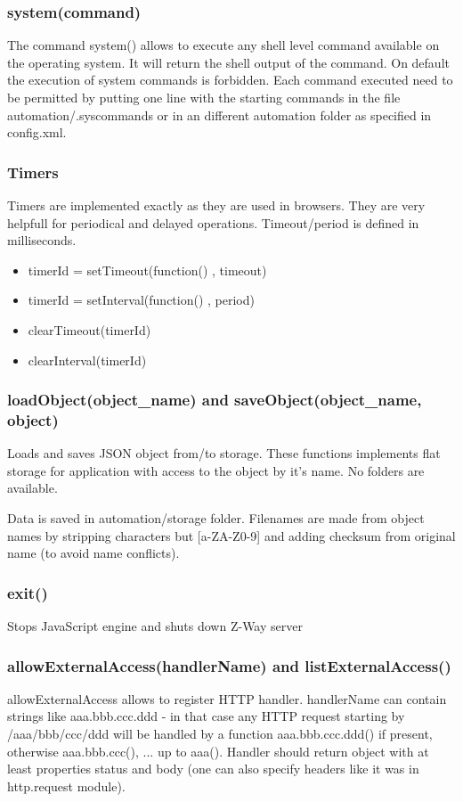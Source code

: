 \subsubsection{system(command)}

The command system() allows to execute any shell level command available on the operating 
system. It will return the shell output of the command.  On default the execution of 
system commands is forbidden. Each command executed need to be permitted by putting one 
line with the starting commands in the file automation/.syscommands or in an different 
automation folder as specified in config.xml.

\subsubsection{Timers}
Timers are implemented exactly as they are used in browsers. They are very helpfull for periodical and delayed operations. Timeout/period is defined in milliseconds.
\begin{itemize}
\item timerId = setTimeout(function() { }, timeout)
\item timerId = setInterval(function() { }, period)
\item clearTimeout(timerId)
\item clearInterval(timerId)
\end{itemize}

\subsubsection{loadObject(object\_name) and saveObject(object\_name, object)}
Loads and saves JSON object from/to storage. These functions implements flat storage for application with access to the object by it's name. No folders are available.

Data is saved in automation/storage folder. Filenames are made from object names by stripping characters but [a-ZA-Z0-9] and adding checksum from original name (to avoid name conflicts).

\subsubsection{exit()}
Stops JavaScript engine and shuts down Z-Way server


\subsubsection{allowExternalAccess(handlerName) and listExternalAccess()}
allowExternalAccess allows to register HTTP handler. handlerName can contain strings like aaa.bbb.ccc.ddd - in that case any HTTP request starting by /aaa/bbb/ccc/ddd will be handled by a function aaa.bbb.ccc.ddd() if present, otherwise aaa.bbb.ccc(), ... up to aaa().
Handler should return object with at least properties status and body (one can also specify headers like it was in http.request module).

